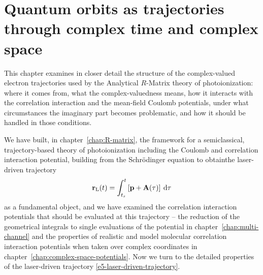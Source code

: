


\chapter[Quantum orbits as trajectories through complex time and complex\texorpdfstring{\\}{} space]{Quantum orbits as trajectories through complex time and complex space}
\label{chap:quantum-orbits}

This chapter examines in closer detail the structure of the complex-valued electron trajectories used by the Analytical $R$-Matrix theory of photoionization: where it comes from, what the complex-valuedness means, how it interacts with the correlation interaction and the mean-field Coulomb potentials, under what circumstances the imaginary part becomes problematic, and how it should be handled in those conditions. 

We have built, in chapter~\ref{chap:R-matrix}, the framework for a semiclassical, trajectory-based theory of photoionization including the Coulomb and correlation interaction potential, building from the Schrödinger equation to obtainthe laser-driven trajectory
\begin{equation}
\vb{r}_\mathrm{L}(t) = \int_{{t_s}}^{t} \left[\vb{p}+\vb{A}(\tau) \right] \: \mathrm{d}\tau
\label{e5-laser-driven-trajectory}
\end{equation}
as a fundamental object, and we have examined  the correlation interaction potentials that should be evaluated at this trajectory -- the reduction of the geometrical integrals to single evaluations of the potential in chapter~\ref{chap:multi-channel} and the properties of realistic and model molecular correlation interaction potentials when taken over complex coordinates in chapter~\ref{chap:complex-space-potentials}. Now we turn to the detailed properties of the laser-driven trajectory \eqref{e5-laser-driven-trajectory}.




